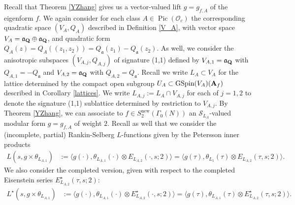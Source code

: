 \documentclass{amsart}
\theoremstyle{definition}
\begin{document}
Recall that Theorem \ref{YZhang} gives us a vector-valued lift $g = g_{f, A}$ of the eigenform $f$. 
We again consider for each class $A \in \operatorname{Pic}(\mathcal{O}_c)$ the corresponding quadratic space $(V_A, Q_A)$ described in
Definition \ref{V_A}, with vector space $V_A = \mathfrak{a}_{\bf{Q}} \oplus \mathfrak{a}_{\bf{Q}}$, and quadratic form 
$Q_A(z) = Q_A((z_1, z_2)) = Q_{\mathfrak{a}}(z_1) - Q_{\mathfrak{a}}(z_2)$.
As well, we consider the anisotropic subspaces $(V_{A, j}, Q_{A, j})$ of signature (1,1) defined by 
$V_{A, 1} = \mathfrak{a}_{\bf{Q}}$ with $Q_{A, 1} = - Q_{\mathfrak{a}}$ and $V_{A, 2} = \mathfrak{a}_{\bf{Q}}$ 
with $Q_{A, 2} = Q_{\mathfrak{a}}$. 
Recall we write $L_A \subset V_A$ for the lattice determined by the compact open
subgroup $U_A \subset \operatorname{GSpin}(V_A)({\bf{A}}_f)$ described in Corollary \ref{lattices}.
We write $L_{A,j}:= L_{A} \cap V_{A, j}$ for each of $j=1, 2$ to denote 
the signature (1,1) sublattice determined by restriction to $V_{A,j}$. 
By Theorem \ref{YZhang}, we can associate to $f \in S_2^{\operatorname{new}}(\Gamma_0(N))$
an $\mathcal{S}_{L_A}$-valued modular form $g = g_{f, A}$ of weight $2$. 
Recall as well that we consider the (incomplete, partial) Rankin-Selberg $L$-functions given by the Petersson inner products
\begin{align*} L(s, g \times \theta_{L_{A,1}}) &:= \langle g(\cdot), \theta_{ L_{A,1} }(\cdot) \otimes E_{L_{A,2}}(\cdot, s; 2)  \rangle
=  \langle g(\tau), \theta_{ L_1 }(\tau) \otimes E_{L_{A,2}}(\tau, s; 2)  \rangle. \end{align*}
We also consider the completed version, given with respect to the completed Eisenstein series $E_{L_{A,2}}^{\star}(\tau, s; 2)$: 
\begin{align*} L^{\star}(s, g \times \theta_{L_{A, 1}}) &:= \langle g(\cdot), \theta_{ L_{A,1} }(\cdot) \otimes E^{\star}_{L_{A,2}}(\cdot, s; 2)  \rangle
=  \langle g(\tau), \theta_{ L_{A,1} }(\tau) \otimes E^{\star}_{L_{A,2}}(\tau, s; 2)  \rangle. \end{align*}
\end{document}
